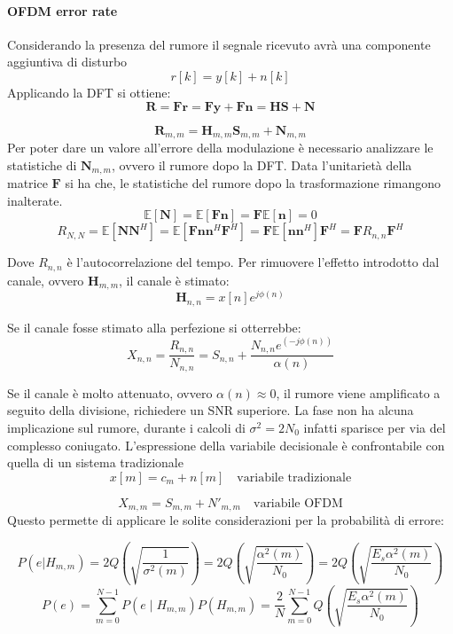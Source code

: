\paragraph*{OFDM error rate}
Considerando la presenza del rumore il segnale ricevuto avrà una componente aggiuntiva di disturbo
\[
    r[k] = y[k] + n[k]
\]
Applicando la DFT si ottiene:
\[
    \mathbf{R} = \mathbf{F}\mathbf{r} = \mathbf{F}\mathbf{y} + \mathbf{F}\mathbf{n} = \mathbf{H}\mathbf{S} + \mathbf{N}
\]

\[
    \mathbf{R}_{m, m} = \mathbf{H}_{m, m}\mathbf{S}_{m, m} + \mathbf{N}_{m, m}
\]
Per poter dare un valore all'errore della modulazione è necessario analizzare le statistiche di $\mathbf{N}_{m,m}$, ovvero il rumore dopo la DFT.
Data l'unitarietà della matrice $\mathbf{F}$ si ha che, le statistiche del rumore dopo la trasformazione rimangono inalterate.
\[
    \mathbb{E}[\mathbf{N}] = \mathbb{E}[\mathbf{F}\mathbf{n}] = \mathbf{F} \mathbb{E}[\mathbf{n}] = 0
\]  
\[
    R_{N,N} = \mathbb{E}[\mathbf{N}\mathbf{N}^H] = \mathbb{E}[\mathbf{F}\mathbf{n}\mathbf{n}^H\mathbf{F}^H] = \mathbf{F}\mathbb{E}[\mathbf{n}\mathbf{n}^H]\mathbf{F}^H = \mathbf{F}R_{n,n}\mathbf{F}^H
\]

Dove $R_{n,n}$ è l'autocorrelazione del tempo.
Per rimuovere l'effetto introdotto dal canale, ovvero $\mathbf{H}_{m,m}$, il canale è stimato:
\[
    \mathbf{H}_{n,n}= x[n] e^{j\phi(n)}
\]

Se il canale fosse stimato alla perfezione si otterrebbe:
\[
    X_{n,n} = \frac{R_{n,n}}{N_{n,n}} = S_{n, n} + \frac{N_{n,n} e^{(-j\phi(n))}}{\alpha(n)}
\]


Se il canale è molto attenuato, ovvero $\alpha(n) \approx 0$, il rumore viene amplificato a seguito della divisione, richiedere un SNR superiore.
La fase non ha alcuna implicazione sul rumore, durante i calcoli di $\sigma ^2=2N_0$ infatti sparisce per via del complesso coniugato.
L'espressione della variabile decisionale è confrontabile con quella di un sistema tradizionale
\[
    x[m] = c_m + n[m] \quad \text{variabile tradizionale}
\]

\[
    X_{m, m} = S_{m, m} + N'_{m, m} \quad \text{variabile OFDM}
\]
Questo permette di applicare le solite considerazioni per la probabilità di errore:

\[
    P(e|H_{m, m}) = 2 Q\left( \sqrt{\frac{1}{\sigma^2(m)}}  \right) =  2 Q\left( \sqrt{\frac{\alpha^2(m)}{N_0}}  \right) = 2 Q\left( \sqrt{\frac{E_s \alpha^2(m)}{N_0}}  \right) 
\]
\[
    P(e) = \sum_{m=0}^{N-1} P(e \mid H_{m, m})P(H_{m,m}) = \frac{2}{N} \sum_{m=0}^{N-1} Q\left( \sqrt{\frac{E_s \alpha^2(m)}{N_0}}  \right)
\]




